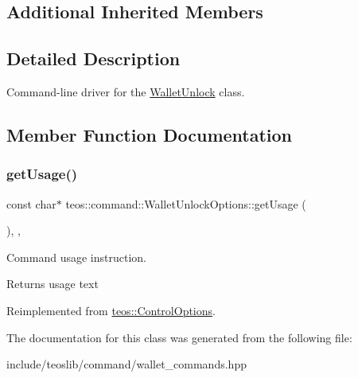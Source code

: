 \subsection*{Additional Inherited Members}


\subsection{Detailed Description}
Command-\/line driver for the \mbox{\hyperlink{classteos_1_1command_1_1_wallet_unlock}{Wallet\+Unlock}} class. 

\subsection{Member Function Documentation}
\mbox{\label{classteos_1_1command_1_1_wallet_unlock_options_aa630c4deec62ef8d44cb37c03573c071}} 
\subsubsection{\texorpdfstring{get\+Usage()}{getUsage()}}
{\footnotesize\ttfamily const char$\ast$ teos\+::command\+::\+Wallet\+Unlock\+Options\+::get\+Usage (\begin{DoxyParamCaption}{ }\end{DoxyParamCaption})\hspace{0.3cm}{\ttfamily [inline]}, {\ttfamily [protected]}, {\ttfamily [virtual]}}



Command \textquotesingle{}usage\textquotesingle{} instruction. 

\begin{DoxyReturn}{Returns}
usage text 
\end{DoxyReturn}


Reimplemented from \mbox{\hyperlink{classteos_1_1_control_options_a0aa5671f9bc750ed5280c26c543874f3}{teos\+::\+Control\+Options}}.



The documentation for this class was generated from the following file\+:\begin{DoxyCompactItemize}
\item 
include/teoslib/command/wallet\+\_\+commands.\+hpp\end{DoxyCompactItemize}
